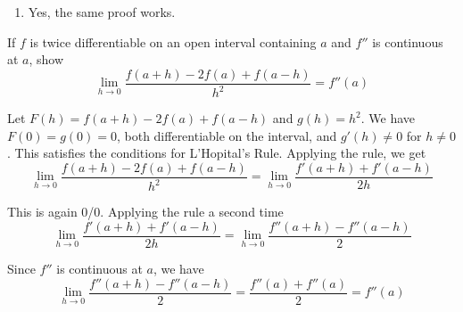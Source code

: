 \documentclass{oxmathproblems}
\begin{document}
\begin{questions}
\begin{solution}
\begin{enumerate}[label=(\alph*)]
    \item Yes, the same proof works.
  \end{enumerate}
\end{solution}

\miquestion If $f$ is twice differentiable on an open interval containing $a$ and $f''$ is continuous at $a$, show 
\[\lim_{h \to 0}\frac{f(a+h)-2f(a)+f(a-h)}{h^2}=f''(a)\]

\begin{solution}
  Let $F(h)=f(a+h)-2f(a)+f(a-h)$ and $g(h)=h^2$. We have $F(0)=g(0)=0$, both differentiable on the interval, and $g'(h) \neq 0$ for $h \neq 0$.
  This satisfies the conditions for L'Hopital's Rule. Applying the rule, we get
  \[\lim_{h \to 0}\frac{f(a+h)-2f(a)+f(a-h)}{h^2} = \lim_{h \to 0}\frac{f'(a+h)+f'(a-h)}{2h}\]
  
  This is again 0/0. Applying the rule a second time
  \[\lim_{h \to 0}\frac{f'(a+h)+f'(a-h)}{2h} = \lim_{h \to 0}\frac{f''(a+h)-f''(a-h)}{2}\]

  Since $f''$ is continuous at $a$, we have
  \[\lim_{h \to 0}\frac{f''(a+h)-f''(a-h)}{2}=\frac{f''(a)+f''(a)}{2}=f''(a)\]
\end{solution}

\end{questions}
\end{document}
